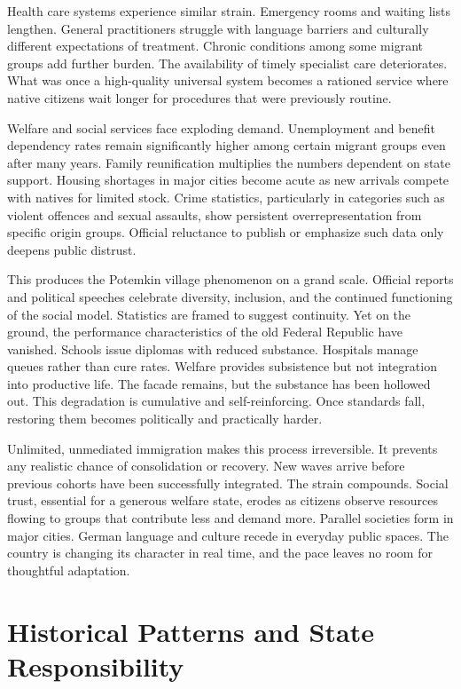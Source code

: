 ﻿\documentclass[12pt,a4paper]{book}
\begin{document}
Health care systems experience similar strain. Emergency rooms and waiting lists lengthen. General practitioners struggle with language barriers and culturally different expectations of treatment. Chronic conditions among some migrant groups add further burden. The availability of timely specialist care deteriorates. What was once a high-quality universal system becomes a rationed service where native citizens wait longer for procedures that were previously routine.

Welfare and social services face exploding demand. Unemployment and benefit dependency rates remain significantly higher among certain migrant groups even after many years. Family reunification multiplies the numbers dependent on state support. Housing shortages in major cities become acute as new arrivals compete with natives for limited stock. Crime statistics, particularly in categories such as violent offences and sexual assaults, show persistent overrepresentation from specific origin groups. Official reluctance to publish or emphasize such data only deepens public distrust.

This produces the Potemkin village phenomenon on a grand scale. Official reports and political speeches celebrate diversity, inclusion, and the continued functioning of the social model. Statistics are framed to suggest continuity. Yet on the ground, the performance characteristics of the old Federal Republic have vanished. Schools issue diplomas with reduced substance. Hospitals manage queues rather than cure rates. Welfare provides subsistence but not integration into productive life. The facade remains, but the substance has been hollowed out. This degradation is cumulative and self-reinforcing. Once standards fall, restoring them becomes politically and practically harder.

Unlimited, unmediated immigration makes this process irreversible. It prevents any realistic chance of consolidation or recovery. New waves arrive before previous cohorts have been successfully integrated. The strain compounds. Social trust, essential for a generous welfare state, erodes as citizens observe resources flowing to groups that contribute less and demand more. Parallel societies form in major cities. German language and culture recede in everyday public spaces. The country is changing its character in real time, and the pace leaves no room for thoughtful adaptation.

\section{Historical Patterns and State Responsibility}
\end{document}
